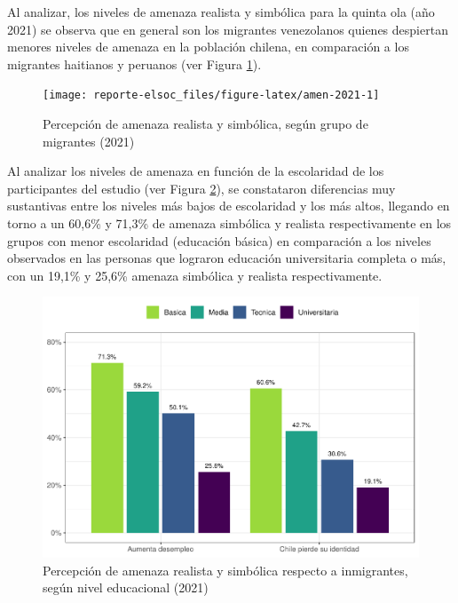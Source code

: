 \documentclass[
  12pt,
]{book}
\begin{document}
Al analizar, los niveles de amenaza realista y simbólica para la quinta ola (año 2021) se observa que en general son los migrantes venezolanos quienes despiertan menores niveles de amenaza en la población chilena, en comparación a los migrantes haitianos y peruanos (ver Figura \ref{fig:amen-2021}).

\begin{figure}

{\centering \texttt{[image: reporte-elsoc\_files/figure-latex/amen-2021-1]} 

}

\caption{Percepción de amenaza realista y simbólica, según grupo de migrantes (2021)}\label{fig:amen-2021}
\end{figure}

Al analizar los niveles de amenaza en función de la escolaridad de los participantes del estudio (ver Figura \ref{fig:amen-educ}), se constataron diferencias muy sustantivas entre los niveles más bajos de escolaridad y los más altos, llegando en torno a un 60,6\% y 71,3\% de amenaza simbólica y realista respectivamente en los grupos con menor escolaridad (educación básica) en comparación a los niveles observados en las personas que lograron educación universitaria completa o más, con un 19,1\% y 25,6\% amenaza simbólica y realista respectivamente.

\begin{figure}

{\centering \includegraphics{reporte-elsoc_files/figure-latex/amen-educ-1} 

}

\caption{Percepción de amenaza realista y simbólica respecto a inmigrantes, según nivel educacional (2021)}\label{fig:amen-educ}
\end{figure}
\end{document}
